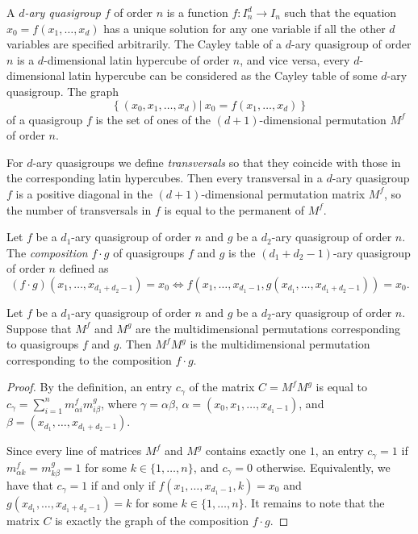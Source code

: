 \documentclass[a4paper]{article}
\begin{document}
A \textit{$d$-ary quasigroup} $f$ of order $n$ is a function $f: I_n^d \rightarrow I_n$ such that the equation $x_0 = f(x_1, \ldots, x_d)$ has a unique solution for any one variable if all the other $d$ variables are specified arbitrarily.  The Cayley table of a $d$-ary quasigroup of order $n$ is a $d$-dimensional latin hypercube of order $n$, and vice versa, every $d$-dimensional latin hypercube can be considered as the Cayley table of some $d$-ary quasigroup. The graph $$\left\{(x_0, x_1, \ldots, x_d) |~ x_0 =f(x_1, \ldots, x_d) \right\}$$ of a quasigroup $f$ is the set of ones of the $(d+1)$-dimensional permutation $M^f$ of order $n$. 

For $d$-ary quasigroups we define \textit{transversals}  so that they coincide with those in the corresponding latin hypercubes.   Then  every transversal in  a $d$-ary quasigroup $f$ is a positive diagonal in the $(d+1)$-dimensional permutation matrix $M^f$, so the number of transversals in $f$ is equal to the permanent of  $M^f$.

Let $f$ be a $d_1$-ary quasigroup of order $n$ and $g$ be  a $d_2$-ary quasigroup of order $n$.  The \textit{composition}  $f \cdot g$ of quasigroups $f$ and $g$ is the $(d_1 + d_2 -1)$-ary quasigroup of order $n$ defined as
$$(f \cdot g) (x_1, \ldots, x_{d_1 + d_2 - 1}) = x_{0}  \Leftrightarrow f (x_{1}, \ldots, x_{d_1 - 1}, g (x_{d_1}, \ldots, x_{d_1+ d_2 -1}) ) = x_0.$$ 


\begin{utv}
Let $f$ be a $d_1$-ary quasigroup of order $n$ and $g$ be  a $d_2$-ary quasigroup of order $n$.  Suppose that   $M^f$ and $M^g$ are the multidimensional permutations  corresponding to quasigroups $f$ and $g$. Then $M^f  M^g$ is the multidimensional permutation corresponding to the composition $f \cdot g$.
\end{utv}

\begin{proof}
By the definition, an entry $c_{\gamma}$ of the matrix $C = M^f M^g$ is equal to $c_{\gamma} = \sum\limits_{i = 1}^n m^f_{\alpha i} m^g_{i\beta}$, where $\gamma = \alpha \beta$, $\alpha = (x_0, x_1, \ldots, x_{d_1 -1})$, and $\beta = (x_{d_1}, \ldots, x_{d_1 + d_2 -1})$.

Since every line of matrices $M^f$ and $M^g$ contains exactly one $1$, an entry $c_\gamma = 1$ if $m^f_{\alpha k}  = m^g_{k \beta} = 1$ for some $k \in \{1, \ldots, n \}$,  and $c_\gamma = 0$ otherwise. Equivalently, we have that $c_\gamma = 1$ if and only if $f(x_{1}, \ldots, x_{d_1 - 1}, k) = x_0$ and $g(x_{d_1}, \ldots, x_{d_1+ d_2 -1})  = k$ for some  $k \in \{1, \ldots, n \}$. It remains to note that the matrix $C$ is exactly the graph of the composition $f \cdot g$. 
\end{proof}
\end{document}
